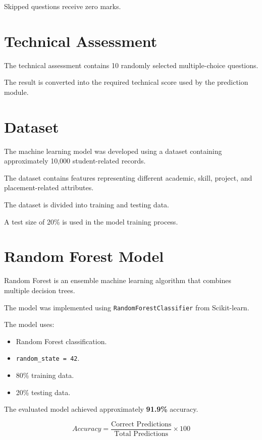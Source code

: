 \documentclass[12pt,a4paper]{report}
\begin{document}
Skipped questions receive zero marks.

\section{Technical Assessment}

The technical assessment contains 10 randomly selected
multiple-choice questions.

The result is converted into the required technical score used
by the prediction module.

\section{Dataset}

The machine learning model was developed using a dataset
containing approximately 10,000 student-related records.

The dataset contains features representing different academic,
skill, project, and placement-related attributes.

The dataset is divided into training and testing data.

A test size of 20\% is used in the model training process.

\section{Random Forest Model}

Random Forest is an ensemble machine learning algorithm that
combines multiple decision trees.

The model was implemented using
\texttt{RandomForestClassifier} from Scikit-learn.

The model uses:

\begin{itemize}
    \item Random Forest classification.
    \item \texttt{random\_state = 42}.
    \item 80\% training data.
    \item 20\% testing data.
\end{itemize}

The evaluated model achieved approximately \textbf{91.9\%}
accuracy.

\begin{equation}
Accuracy =
\frac{\text{Correct Predictions}}
{\text{Total Predictions}}
\times 100
\end{equation}
\end{document}
